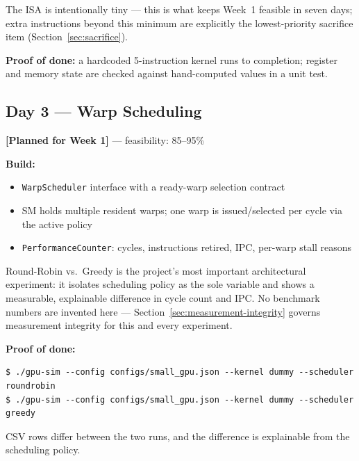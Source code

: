 \documentclass[11pt]{article}
\newcommand{\statuslabel}[1]{\textbf{\textcolor{steel}{[#1]}}}
\begin{document}
The ISA is intentionally tiny --- this is what keeps Week~1 feasible in
seven days; extra instructions beyond this minimum are explicitly the
lowest-priority sacrifice item (Section~\ref{sec:sacrifice}).

\textbf{Proof of done:} a hardcoded 5-instruction kernel runs to
completion; register and memory state are checked against hand-computed
values in a unit test.

\subsection{Day 3 --- Warp Scheduling}
\statuslabel{Planned for Week 1} --- feasibility: 85--95\%

\begin{center}
\end{center}

\textbf{Build:}
\begin{itemize}[leftmargin=1.2cm]
  \item \texttt{WarpScheduler} interface with a ready-warp selection
  contract
  \item SM holds multiple resident warps; one warp is issued/selected per
  cycle via the active policy
  \item \texttt{PerformanceCounter}: cycles, instructions retired, IPC,
  per-warp stall reasons
\end{itemize}

Round-Robin vs.\ Greedy is the project's most important architectural
experiment: it isolates scheduling policy as the sole variable and shows a
measurable, explainable difference in cycle count and IPC. No benchmark
numbers are invented here --- Section~\ref{sec:measurement-integrity}
governs measurement integrity for this and every experiment.

\textbf{Proof of done:}
\begin{lstlisting}
$ ./gpu-sim --config configs/small_gpu.json --kernel dummy --scheduler roundrobin
$ ./gpu-sim --config configs/small_gpu.json --kernel dummy --scheduler greedy
\end{lstlisting}
CSV rows differ between the two runs, and the difference is explainable
from the scheduling policy.
\end{document}
